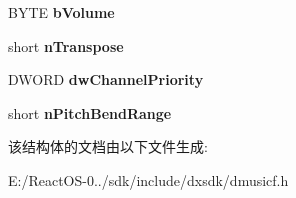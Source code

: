 \begin{DoxyCompactItemize}
B\+Y\+TE {\bfseries b\+Volume}
\item 
\mbox{\label{struct___d_m_u_s___i_o___i_n_s_t_r_u_m_e_n_t_a41664865e5e16e2203ec36ef65129848}} 
short {\bfseries n\+Transpose}
\item 
\mbox{\label{struct___d_m_u_s___i_o___i_n_s_t_r_u_m_e_n_t_a98f935b1e97c3b2e248e739393c320f2}} 
D\+W\+O\+RD {\bfseries dw\+Channel\+Priority}
\item 
\mbox{\label{struct___d_m_u_s___i_o___i_n_s_t_r_u_m_e_n_t_a2a3c9e19f88246cd4d26a2cfe099046b}} 
short {\bfseries n\+Pitch\+Bend\+Range}
\end{DoxyCompactItemize}


该结构体的文档由以下文件生成\+:\begin{DoxyCompactItemize}
\item 
E\+:/\+React\+O\+S-\/0../sdk/include/dxsdk/dmusicf.\+h\end{DoxyCompactItemize}
